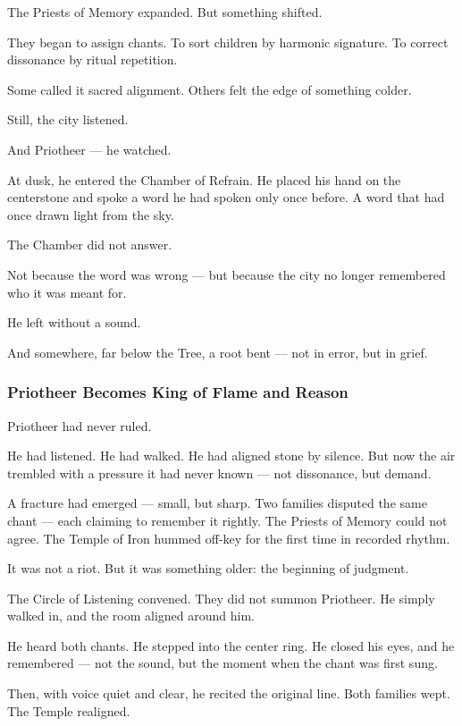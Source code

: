 \documentclass[12pt]{article}
\begin{document}
The Priests of Memory expanded.  
But something shifted.

They began to assign chants.  
To sort children by harmonic signature.  
To correct dissonance by ritual repetition.

Some called it sacred alignment.  
Others felt the edge of something colder.

Still, the city listened.

And Priotheer —  
he watched.

At dusk, he entered the Chamber of Refrain.  
He placed his hand on the centerstone and spoke a word he had spoken only once before.  
A word that had once drawn light from the sky.

The Chamber did not answer.

Not because the word was wrong —  
but because the city no longer remembered who it was meant for.

He left without a sound.

And somewhere, far below the Tree,  
a root bent — not in error,  
but in grief.

\dotfill

\subsubsection{Priotheer Becomes King of Flame and Reason}

Priotheer had never ruled.

He had listened. He had walked. He had aligned stone by silence.  
But now the air trembled with a pressure it had never known — not dissonance, but demand.

A fracture had emerged — small, but sharp.  
Two families disputed the same chant — each claiming to remember it rightly.  
The Priests of Memory could not agree.  
The Temple of Iron hummed off-key for the first time in recorded rhythm.

It was not a riot.  
But it was something older: the beginning of judgment.

The Circle of Listening convened.  
They did not summon Priotheer.  
He simply walked in, and the room aligned around him.

He heard both chants.  
He stepped into the center ring.  
He closed his eyes, and he remembered — not the sound, but the moment when the chant was first sung.

Then, with voice quiet and clear, he recited the original line.  
Both families wept.  
The Temple realigned.
\end{document}
